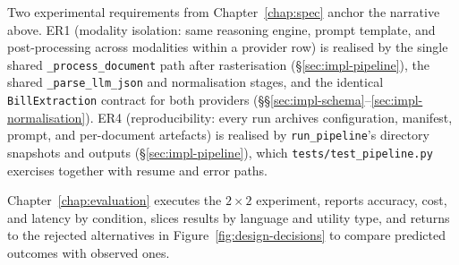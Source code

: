 Two experimental requirements from Chapter~\ref{chap:spec} anchor
the narrative above. ER1 (modality isolation: same reasoning engine,
prompt template, and post-processing across modalities within a
provider row) is realised by the single shared
\texttt{\_process\_document} path after rasterisation
(\S\ref{sec:impl-pipeline}), the shared \texttt{\_parse\_llm\_json}
and normalisation stages, and the identical \texttt{BillExtraction}
contract for both providers (\S\S\ref{sec:impl-schema}--\ref{sec:impl-normalisation}).
ER4 (reproducibility: every run archives configuration, manifest,
prompt, and per-document artefacts) is realised by
\texttt{run\_pipeline}'s directory snapshots and outputs
(\S\ref{sec:impl-pipeline}), which \texttt{tests/test\_pipeline.py}
exercises together with resume and error paths.

Chapter~\ref{chap:evaluation} executes the $2 \times 2$ experiment,
reports accuracy, cost, and latency by condition, slices results by
language and utility type, and returns to the rejected alternatives
in Figure~\ref{fig:design-decisions} to compare predicted outcomes
with observed ones.
